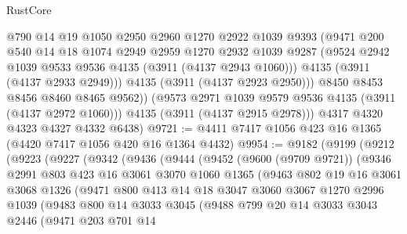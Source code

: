 \begin{lexlean}{RustCore}
\begin{coremodule}
              @790
              @14
              @19
              @1050
              @2950
              @2960
              @1270
              @2922
              @1039
              @9393
              (@9471
                @200
                @540
                @14
                @18
                @1074
                @2949
                @2959
                @1270
                @2932
                @1039
                @9287
                (@9524 @2942 @1039 @9533 @9536 @4135 (@3911 (@4137 @2943 @1060)))
                @4135
                (@3911 (@4137 @2933 @2949)))
              @4135
              (@3911 (@4137 @2923 @2950)))
            @8450
            @8453
            @8456
            @8460
            @8465
            @9562))
        (@9573 @2971 @1039 @9579 @9536 @4135 (@3911 (@4137 @2972 @1060)))
        @4135
        (@3911 (@4137 @2915 @2978)))
      @4317
      @4320
      @4323
      @4327
      @4332
      @6438)
@9721 := @4411 @7417 @1056 @423 @16 @1365 (@4420 @7417 @1056 @420 @16 @1364 @4432)
@9954 := @9182
    (@9199
      (@9212
        (@9223
          (@9227
            (@9342
              (@9436
                (@9444
                  (@9452
                    (@9600 (@9709 @9721))
                    (@9346
                      @2991
                      @803
                      @423
                      @16
                      @3061
                      @3070
                      @1060
                      @1365
                      (@9463
                        @802
                        @19
                        @16
                        @3061
                        @3068
                        @1326
                        (@9471
                          @800
                          @413
                          @14
                          @18
                          @3047
                          @3060
                          @3067
                          @1270
                          @2996
                          @1039
                          (@9483
                            @800
                            @14
                            @3033
                            @3045
                            (@9488
                              @799
                              @20
                              @14
                              @3033
                              @3043
                              @2446
                              (@9471
                                @203
                                @701
                                @14

\end{coremodule}
\end{lexlean}
